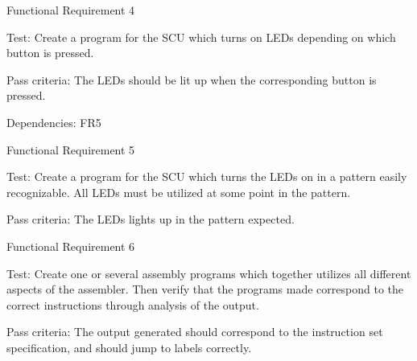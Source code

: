 {\sc Functional Requirement 4}
\begin{Test}
  {\em \FRIV}
  
  {\sc Test:} Create a program for the \ac{SCU} which turns on \acp{LED}
  depending on which button is pressed.

  {\sc Pass criteria:} The \acp{LED} should be lit up when the corresponding
  button is pressed.

  {\sc Dependencies:} FR5
\end{Test}

{\sc Functional Requirement 5}
\begin{Test}
  {\em \FRV}
  
  {\sc Test:} Create a program for the \ac{SCU} which turns the \acp{LED} on in
  a pattern easily recognizable. All \acp{LED} must be utilized at some point
  in the pattern.

  {\sc Pass criteria:} The LEDs lights up in the pattern expected.
\end{Test}

\newpage %
{\sc Functional Requirement 6}
\begin{Test}
  {\em \FRVI}
  
  {\sc Test:} Create one or several assembly programs which together utilizes
  all different aspects of the assembler. Then verify that the programs made
  correspond to the correct instructions through analysis of the output.

  {\sc Pass criteria:} The output generated should correspond to the instruction
  set specification, and should jump to labels correctly.
\end{Test}



